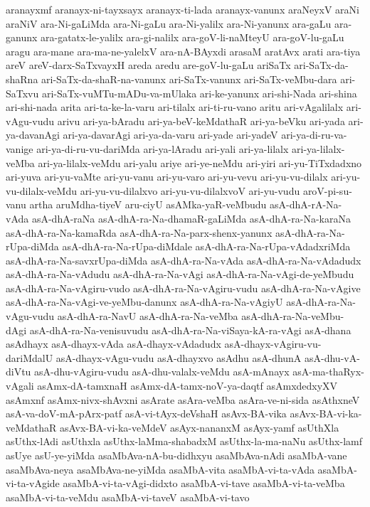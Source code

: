 {aranayxmf
aranayx-ni-tayxsayx
aranayx-ti-lada
aranayx-vanunx
araNeyxV
araNi
araNiV
ara-Ni-gaLiMda
ara-Ni-gaLu
ara-Ni-yalilx
ara-Ni-yanunx
ara-gaLu
ara-ganunx
ara-gatatx-le-yalilx
ara-gi-nalilx
ara-goV-li-naMteyU
ara-goV-lu-gaLu
aragu
ara-mane
ara-ma-ne-yalelxV
ara-nA-BAyxdi
arasaM
aratAvx
arati
ara-tiya
areV
areV-darx-SaTxvayxH
areda
aredu
are-goV-lu-gaLu
ariSaTx
ari-SaTx-da-shaRna
ari-SaTx-da-shaR-na-vanunx
ari-SaTx-vanunx
ari-SaTx-veMbu-dara
ari-SaTxvu
ari-SaTx-vuMTu-mADu-va-mUlaka
ari-ke-yanunx
ari-shi-Nada
ari-shina
ari-shi-nada
arita
ari-ta-ke-la-varu
ari-tilalx
ari-ti-ru-vano
aritu
ari-vAgalilalx
ari-vAgu-vudu
arivu
ari-ya-bAradu
ari-ya-beV-keMdathaR
ari-ya-beVku
ari-yada
ari-ya-davanAgi
ari-ya-davarAgi
ari-ya-da-varu
ari-yade
ari-yadeV
ari-ya-di-ru-va-vanige
ari-ya-di-ru-vu-dariMda
ari-ya-lAradu
ari-yali
ari-ya-lilalx
ari-ya-lilalx-veMba
ari-ya-lilalx-veMdu
ari-yalu
ariye
ari-ye-neMdu
ari-yiri
ari-yu-TiTxdadxno
ari-yuva
ari-yu-vaMte
ari-yu-vanu
ari-yu-varo
ari-yu-vevu
ari-yu-vu-dilalx
ari-yu-vu-dilalx-veMdu
ari-yu-vu-dilalxvo
ari-yu-vu-dilalxvoV
ari-yu-vudu
aroV-pi-su-vanu
artha
aruMdha-tiyeV
aru-ciyU
asAMka-yaR-veMbudu
asA-dhA-rA-Na-vAda
asA-dhA-raNa
asA-dhA-ra-Na-dhamaR-gaLiMda
asA-dhA-ra-Na-karaNa
asA-dhA-ra-Na-kamaRda
asA-dhA-ra-Na-parx-shenx-yanunx
asA-dhA-ra-Na-rUpa-diMda
asA-dhA-ra-Na-rUpa-diMdale
asA-dhA-ra-Na-rUpa-vAdadxriMda
asA-dhA-ra-Na-savxrUpa-diMda
asA-dhA-ra-Na-vAda
asA-dhA-ra-Na-vAdadudx
asA-dhA-ra-Na-vAdudu
asA-dhA-ra-Na-vAgi
asA-dhA-ra-Na-vAgi-de-yeMbudu
asA-dhA-ra-Na-vAgiru-vudo
asA-dhA-ra-Na-vAgiru-vudu
asA-dhA-ra-Na-vAgive
asA-dhA-ra-Na-vAgi-ve-yeMbu-danunx
asA-dhA-ra-Na-vAgiyU
asA-dhA-ra-Na-vAgu-vudu
asA-dhA-ra-NavU
asA-dhA-ra-Na-veMba
asA-dhA-ra-Na-veMbu-dAgi
asA-dhA-ra-Na-venisuvudu
asA-dhA-ra-Na-viSaya-kA-ra-vAgi
asA-dhana
asAdhayx
asA-dhayx-vAda
asA-dhayx-vAdadudx
asA-dhayx-vAgiru-vu-dariMdalU
asA-dhayx-vAgu-vudu
asA-dhayxvo
asAdhu
asA-dhunA
asA-dhu-vA-diVtu
asA-dhu-vAgiru-vudu
asA-dhu-valalx-veMdu
asA-mAnayx
asA-ma-thaRyx-vAgali
asAmx-dA-tamxnaH
asAmx-dA-tamx-noV-ya-daqtf
asAmxdedxyXV
asAmxnf
asAmx-nivx-shAvxni
asArate
asAra-veMba
asAra-ve-ni-sida
asAthxneV
asA-va-doV-mA-pArx-patf
asA-vi-tAyx-deVshaH
asAvx-BA-vika
asAvx-BA-vi-ka-veMdathaR
asAvx-BA-vi-ka-veMdeV
asAyx-nananxM
asAyx-yamf
asUthXla
asUthx-lAdi
asUthxla
asUthx-laMma-shabadxM
asUthx-la-ma-naNu
asUthx-lamf
asUye
asU-ye-yiMda
asaMbAva-nA-bu-didhxyu
asaMbAva-nAdi
asaMbA-vane
asaMbAva-neya
asaMbAva-ne-yiMda
asaMbA-vita
asaMbA-vi-ta-vAda
asaMbA-vi-ta-vAgide
asaMbA-vi-ta-vAgi-didxto
asaMbA-vi-tave
asaMbA-vi-ta-veMba
asaMbA-vi-ta-veMdu
asaMbA-vi-taveV
asaMbA-vi-tavo
}
